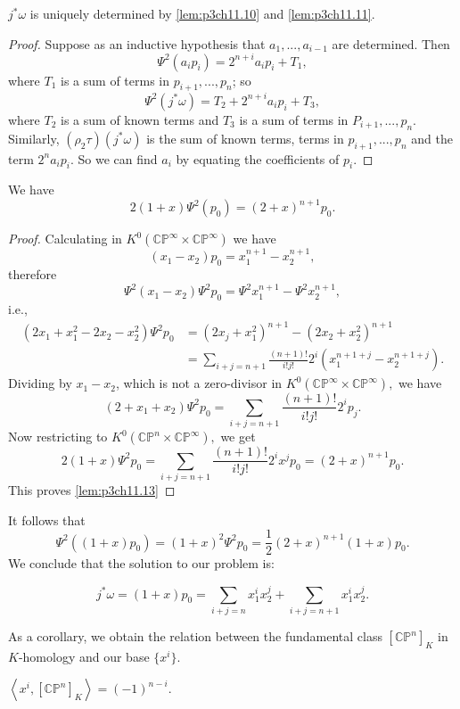 \documentclass[../main]{subfiles}
\begin{document}
\begin{lemma} \label{lem:p3ch11.12}
$j^\ast \omega$ is uniquely determined by \ref{lem:p3ch11.10} and \ref{lem:p3ch11.11}.
\end{lemma}
\begin{proof}
Suppose as an inductive hypothesis that $a_1,...,a_{i-1}$ are determined. Then 
\[\Psi^2(a_ip_i)=2^{n+i}a_ip_i+T_1,\] 
where $T_1$ is a sum of terms in $p_{i+1},...,p_n$; so 
\[\Psi^2(j^\ast \omega)=T_2+2^{n+i}a_ip_i+T_3,\]
where $T_2$ is a sum of known terms and $T_3$ is a sum of terms in $P_{i+1},...,p_n.$ Similarly, $(\rho_2\tau)(j^\ast \omega)$ is the sum of known terms, terms in $p_{i+1},...,p_n$ and the term $2^na_ip_i$. So we can find $a_i$ by equating the coefficients of $p_i$.
\end{proof}
\begin{lemma}\label{lem:p3ch11.13}
We have 
\[2(1+x)\Psi^2(p_0)=(2+x)^{n+1}p_0.\]
\end{lemma}
\begin{proof}
Calculating in $K^0(\mathbb{CP}^\infty\times\mathbb{CP}^\infty)$ we have 
\[(x_1-x_2)p_0=x_1^{n+1}-x_2^{n+1},\]
therefore 
\[\Psi^2(x_1-x_2)\Psi^2p_0=\Psi^2x_1^{n+1}-\Psi^2x_2^{n+1},\]
i.e.,
\begin{align}
    (2x_1+x_1^2-2x_2-x_2^2)\Psi^2p_0 &= (2x_j+x_1^2)^{n+1}-(2x_2+x_2^2)^{n+1} \nonumber \\
    &=\sum_{i+j=n+1}\frac{(n+1)!}{i!j!}2^i(x_1^{n+1+j}-x_2^{n+1+j}). \nonumber
\end{align}
Dividing by $x_1-x_2$, which is not a zero-divisor in $K^0(\mathbb{CP}^\infty\times\mathbb{CP}^\infty),$ we have 
\[(2+x_1+x_2)\Psi^2p_0=\sum_{i+j=n+1}\frac{(n+1)!}{i!j!}2^ip_j.\]
Now restricting to $K^0(\mathbb{CP}^n\times\mathbb{CP}^\infty),$ we get
\[2(1+x)\Psi^2p_0=\sum_{i+j=n+1}\frac{(n+1)!}{i!j!}2^ix^jp_0=(2+x)^{n+1}p_0.\]
This proves \ref{lem:p3ch11.13}
\end{proof}
\par It follows that 
\[\Psi^2((1+x)p_0)=(1+x)^2\Psi^2p_0=\frac{1}{2}(2+x)^{n+1}(1+x)p_0.\]
We conclude that the solution to our problem is:
\begin{theorem}\label{thm:p3ch11.14}
\[j^\ast \omega=(1+x)p_0=\sum_{i+j=n}x_1^ix_2^j + \sum_{i+j=n+1}x_1^ix_2^j.\]
\end{theorem}
As a corollary, we obtain the relation between the fundamental class $[\mathbb{CP}^n]_K$ in $K$-homology and our base $\{x^i\}$.
\begin{theorem}\label{thm:p3ch11.15}
$\left<x^i,[\mathbb{CP}^n]_K\right>=(-1)^{n-i}.$
\end{theorem}
\end{document}
